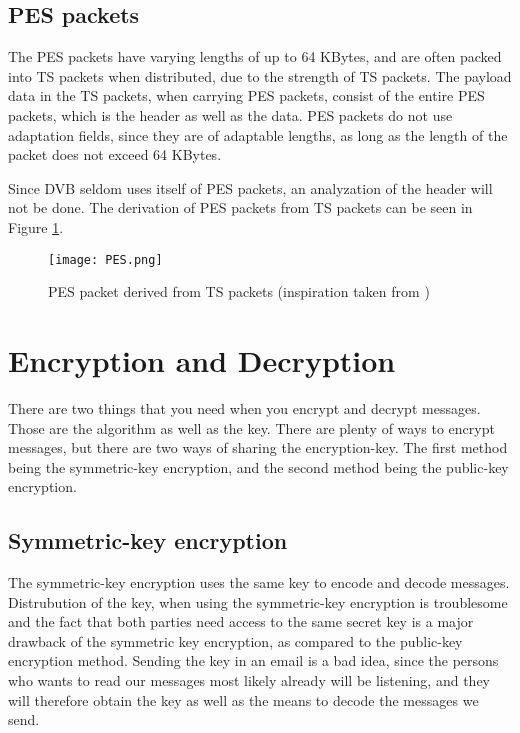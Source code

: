 \subsection{PES packets}
The PES packets have varying lengths of up to 64 KBytes, and are often packed 
into TS packets when distributed, due to the strength of TS packets. The payload 
data in the TS packets, when carrying PES packets, consist of the entire PES 
packets, which is the header as well as the data. PES packets do not use 
adaptation fields, since they are of adaptable lengths, as long as the length of 
the packet does not exceed 64 KBytes.

Since DVB seldom uses itself of PES packets, an analyzation of the header will 
not be done. The derivation of PES packets from TS packets can be seen in Figure \ref{img:PES}.


\begin{figure}
  \texttt{[image: PES.png]}
  \caption{PES packet derived from TS packets (inspiration taken from 
    \citep[p. 9]{ETR:289} ) }
  \label{img:PES}
\end{figure}

\section{Encryption and Decryption}
There are two things that you need when you encrypt and decrypt messages. Those 
are the algorithm as well as the key. There are plenty of ways to encrypt 
messages, but there are two ways of sharing the encryption-key. The first method 
being the symmetric-key encryption, and the second method being the public-key 
encryption.

\subsection{Symmetric-key encryption}
The symmetric-key encryption uses the same key to encode and decode messages. 
Distrubution of the key, when using the symmetric-key encryption is troublesome 
and the fact that both parties need access to the same secret key is a major 
drawback of the symmetric key encryption, as compared to the public-key 
encryption method. Sending the key in an email is a bad idea, since the persons 
who wants to read our messages  most likely already will be listening, and they 
will therefore obtain the key as well as the means to decode the messages we 
send.

